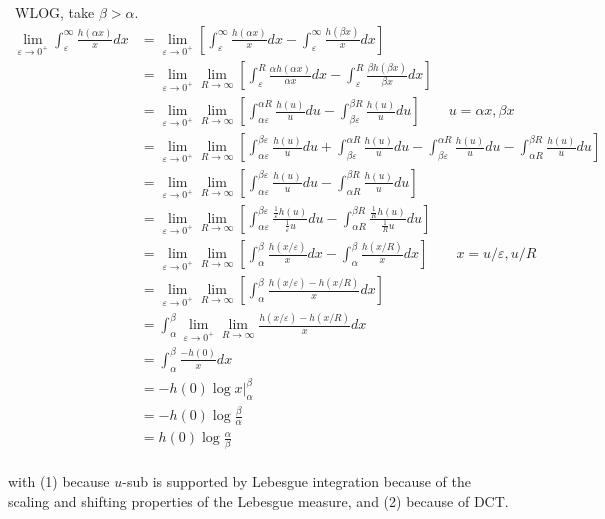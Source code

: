 \documentclass[12pt]{Qual}
\begin{document}
\begin{solution}$\,$
WLOG, take $\beta>\alpha.$
\begin{align*}
    \lim_{\varepsilon\to0^+}\int_\varepsilon^\infty\frac{h(\alpha x)}{x}dx&=\lim_{\varepsilon\to0^+}\left[\int_\varepsilon^\infty\frac{h(\alpha x)}{x}dx-\int_\varepsilon^\infty\frac{h(\beta x)}{x}dx\right]\\
    &=\lim_{\varepsilon\to0^+}\lim_{R\to\infty}\left[\int_\varepsilon^R\frac{\alpha h(\alpha x)}{\alpha x}dx-\int_\varepsilon^R\frac{\beta h(\beta x)}{\beta x}dx\right]\\
    &=\lim_{\varepsilon\to0^+}\lim_{R\to\infty}\left[\int_{\alpha\varepsilon}^{\alpha R}\frac{h(u)}{u}du-\int_{\beta\varepsilon}^{\beta R}\frac{h(u)}{u}du\right]\qquad u=\alpha x,\beta x\tag{1}\\
    &=\lim_{\varepsilon\to0^+}\lim_{R\to\infty}\left[\int_{\alpha\varepsilon}^{\beta\varepsilon}\frac{h(u)}{u}du+\int_{\beta\varepsilon}^{\alpha R}\frac{h(u)}{u}du-\int_{\beta\varepsilon}^{\alpha R}\frac{h(u)}{u}du-\int_{\alpha R}^{\beta R}\frac{h(u)}{u}du\right]\\
    &=\lim_{\varepsilon\to0^+}\lim_{R\to\infty}\left[\int_{\alpha\varepsilon}^{\beta\varepsilon}\frac{h(u)}{u}du-\int_{\alpha R}^{\beta R}\frac{h(u)}{u}du\right]\\
    &=\lim_{\varepsilon\to0^+}\lim_{R\to\infty}\left[\int_{\alpha\varepsilon}^{\beta\varepsilon}\frac{\frac{1}{\varepsilon}h(u)}{\frac{1}{\varepsilon}u}du-\int_{\alpha R}^{\beta R}\frac{\frac{1}{R}h(u)}{\frac{1}{R}u}du\right]\\
    &=\lim_{\varepsilon\to0^+}\lim_{R\to\infty}\left[\int_\alpha^\beta\frac{h(x/\varepsilon)}{x}dx-\int_\alpha^\beta\frac{h(x/R)}{x}dx\right]\qquad x=u/\varepsilon,u/R\\
    &=\lim_{\varepsilon\to0^+}\lim_{R\to\infty}\left[\int_\alpha^\beta\frac{h(x/\varepsilon)-h(x/R)}{x}dx\right]\\
    &=\int_\alpha^\beta\lim_{\varepsilon\to0^+}\lim_{R\to\infty}\frac{h(x/\varepsilon)-h(x/R)}{x}dx\tag{2}\\
     &=\int_\alpha^\beta\frac{-h(0)}{x}dx\\
     &=-h(0)\log x\big|_\alpha^\beta\\
     &=-h(0)\log\frac{\beta}{\alpha}\\
     &=h(0)\log\frac{\alpha}{\beta}\\
\end{align*}

with (1) because $u$-sub is supported by Lebesgue integration because of the scaling and shifting properties of the Lebesgue measure, and (2) because of DCT.


\end{solution}
\end{document}

